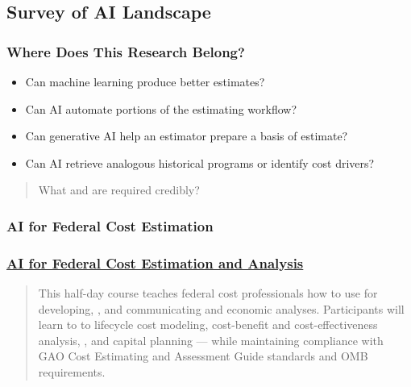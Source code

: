 \subsection{Survey of AI Landscape}
%
\begin{frame}\frametitle{Where Does This Research Belong?}
	\begin{itemize}
		\item Can machine learning produce better estimates?
		\item Can AI automate portions of the estimating workflow?
		\item Can generative AI help an estimator prepare a basis of estimate?
		\item Can AI retrieve analogous historical programs or identify cost drivers?
	\end{itemize}
	\vspace{0.5cm}
	\begin{quotation}
		What  and  are required  credibly?
	\end{quotation}
\end{frame}

\subsubsection{AI for Federal Cost Estimation}
%
\begin{frame}\frametitle{\href{https://www.graduateschool.edu/courses/ai-for-federal-cost-estimation-and-analysis-course}{AI for Federal Cost Estimation and Analysis}}
\begin{quotation}
This half-day course teaches federal cost professionals how to use  for developing, , and communicating  and economic analyses. Participants will learn to  to lifecycle cost modeling, cost-benefit and cost-effectiveness analysis, , and capital planning — while maintaining compliance with GAO Cost Estimating and Assessment Guide standards and OMB requirements.
\end{quotation}
\end{frame}
%
